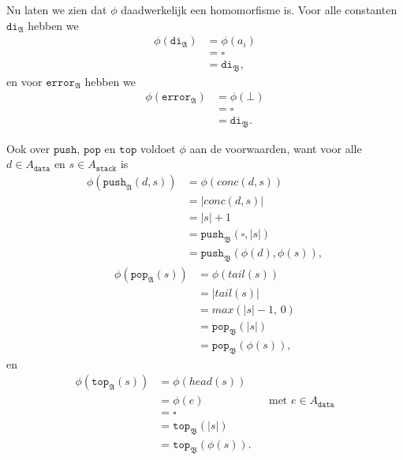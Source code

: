 \documentclass[a4paper,11pt]{article}
\begin{document}
Nu laten we zien dat $\phi$ daadwerkelijk een homomorfisme is. Voor alle
constanten $\texttt{di}_{\mathfrak{A}}$ hebben we
\begin{align*}
\phi(\texttt{di}_{\mathfrak{A}}) &= \phi(a_{i}) \\
                                 &= \square \\
                                 &= \texttt{di}_{\mathfrak{B}},
\end{align*}
en voor $\texttt{error}_{\mathfrak{A}}$ hebben we
\begin{align*}
\phi(\texttt{error}_{\mathfrak{A}}) &= \phi(\bot) \\
                                    &= \square \\
                                    &= \texttt{di}_{\mathfrak{B}}.
\end{align*}

Ook over $\texttt{push}$, $\texttt{pop}$ en $\texttt{top}$ voldoet $\phi$ aan
de voorwaarden, want voor alle $d \in A_{\texttt{data}}$ en $s \in
A_{\texttt{stack}}$ is
\begin{align*}
\phi(\texttt{push}_{\mathfrak{A}}(d,s)) &= \phi(conc(d,s)) \\
                                        &= |conc(d,s)| \\
                                        &= |s| + 1 \\
                                        &= \texttt{push}_{\mathfrak{B}}(\square,|s|) \\
                                        &= \texttt{push}_{\mathfrak{B}}(\phi(d),\phi(s)),
\end{align*}
\begin{align*}
\phi(\texttt{pop}_{\mathfrak{A}}(s)) &= \phi(tail(s)) \\
                                     &= |tail(s)| \\
                                     &= max(|s| - 1, \, 0) \\
                                     &= \texttt{pop}_{\mathfrak{B}}(|s|) \\
                                     &= \texttt{pop}_{\mathfrak{B}}(\phi(s)),
\end{align*}
en
\begin{align*}
\phi(\texttt{top}_{\mathfrak{A}}(s)) &= \phi(head(s)) \\
                                     &= \phi(e) &&\text{met $e \in A_{\texttt{data}}$} \\
                                     &= \square \\
                                     &= \texttt{top}_{\mathfrak{B}}(|s|) \\
                                     &= \texttt{top}_{\mathfrak{B}}(\phi(s)).
\end{align*}
\end{document}
